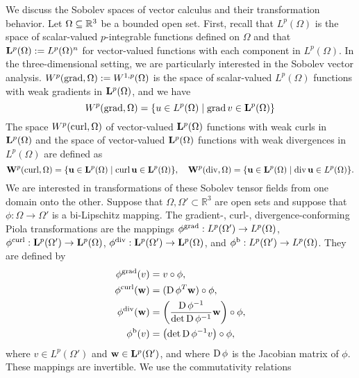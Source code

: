 \documentclass[a4paper]{article}
\begin{document}
We discuss the Sobolev spaces of vector calculus and their transformation behavior. 
Let $\Omega \subseteq {\mathbb R}^{3}$ be a bounded open set. 
First, recall that $L^{p}(\Omega)$ is the space of scalar-valued $p$-integrable functions defined on $\Omega$
and that ${\mathbf L}^{p}(\Omega) := L^{p}(\Omega)^{n}$ for vector-valued functions with each component in $L^{p}(\Omega)$. 
In the three-dimensional setting, we are particularly interested in the Sobolev vector analysis. 
$W^p(\operatorname{grad},\Omega) := W^{1,p}(\Omega)$ is the space of scalar-valued $L^{p}(\Omega)$ functions with weak gradients in ${\mathbf L}^{p}(\Omega)$, and we have 
\[
    W^p(\grad,\Omega) = \{ u \in L^{p}(\Omega) \suchthat \grad v \in \bfL^{p}(\Omega) \}
\]
The space $W^{p}(\operatorname{curl},\Omega)$ of vector-valued ${\mathbf L}^{p}(\Omega)$ functions with weak curls in ${\mathbf L}^{p}(\Omega)$
and the space of vector-valued ${\mathbf L}^{p}(\Omega)$ functions with weak divergences in $L^{p}(\Omega)$ are defined as 
\[
    \bfW^{p}(\curl,\Omega) = \{ \bfu \in \bfL^{p}(\Omega) \suchthat \curl \bfu \in \bfL^{p}(\Omega) \},
    \quad 
    \bfW^{p}(\divergence,\Omega) = \{ \bfu \in \bfL^{p}(\Omega) \suchthat \divergence \bfu \in L^{p}(\Omega) \}.
\]
We are interested in transformations of these Sobolev tensor fields from one domain onto the other. 
Suppose that $\Omega, \Omega' \subset \mathbb{R}^3$ are open sets and suppose that $\phi: \Omega \to \Omega'$ is a bi-Lipschitz mapping.
The gradient-, curl-, divergence-conforming Piola transformations are the mappings 
$\phi^{\operatorname{grad}}: L^{p}(\Omega') \to L^{p}(\Omega)$,
$\phi^{\operatorname{curl}}: {\mathbf L}^{p}(\Omega') \to {\mathbf L}^{p}(\Omega)$, 
$\phi^{\operatorname{div}}: {\mathbf L}^{p}(\Omega') \to {\mathbf L}^{p}(\Omega)$,
and
$\phi^{\rm b}: L^{p}(\Omega') \to L^{p}(\Omega)$. 
They are defined by 
\begin{subequations}\label{eq_definition_piola}
\begin{align}
    \phi^{\operatorname{grad}}(v) &= v \circ \phi, \\
    \phi^{\operatorname{curl}}({\mathbf w}) &= (\operatorname{D}\phi^{T} {\mathbf w}) \circ \phi, \\
    \phi^{\operatorname{div}}({\mathbf w}) &= \left( \frac{ \operatorname{D}\phi^{-1} }{\det\operatorname{D}\phi^{-1}} {\mathbf w} \right)  \circ \phi, \\
    \phi^{\rm b}(v) &= \left( \det\operatorname{D}\phi^{-1} v \right)  \circ \phi,
\end{align}
\end{subequations}
where $v \in L^{p}(\Omega')$ and ${\mathbf w} \in {\mathbf L}^{p}(\Omega')$, 
and where $\operatorname{D}\phi$ is the Jacobian matrix of $\phi$. 
These mappings are invertible. 
%
%
We use the commutativity relations 
\end{document}
